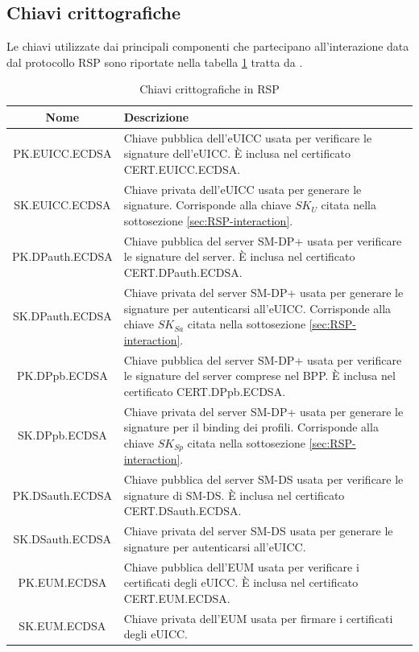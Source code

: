 \documentclass[10pt, twoside, openany]{book}
\begin{document}
\subsection{Chiavi crittografiche}
Le chiavi utilizzate dai principali componenti che partecipano all'interazione data dal protocollo RSP sono riportate nella tabella \ref{tab:keys} tratta da \cite{GSMA-docs}.
\begin{table}[h!]
\begin{center}
\captionsetup{skip=4pt}
\caption{Chiavi crittografiche in RSP}
\label{tab:keys}
\begin{tabularx}{\textwidth}{|c|X|}
\hline
\textbf{Nome} & \textbf{Descrizione}\\
\hline
PK.EUICC.ECDSA & Chiave pubblica dell'eUICC usata per verificare le signature dell'eUICC. È inclusa nel certificato CERT.EUICC.ECDSA.\\
\hline
SK.EUICC.ECDSA & Chiave privata dell'eUICC usata per generare le signature. Corrisponde alla chiave $SK_{U}$ citata nella sottosezione \ref{sec:RSP-interaction}.\\
\hline
PK.DPauth.ECDSA & Chiave pubblica del server SM-DP+ usata per verificare le signature del server. È inclusa nel certificato CERT.DPauth.ECDSA.\\
\hline
SK.DPauth.ECDSA & Chiave privata del server SM-DP+ usata per generare le signature per autenticarsi all'eUICC. Corrisponde alla chiave $SK_{Sa}$ citata nella sottosezione \ref{sec:RSP-interaction}.\\
\hline
PK.DPpb.ECDSA & Chiave pubblica del server SM-DP+ usata per verificare le signature del server comprese nel BPP.  È inclusa nel certificato CERT.DPpb.ECDSA.\\
\hline
SK.DPpb.ECDSA & Chiave privata del server SM-DP+ usata per generare le signature per il binding dei profili. Corrisponde alla chiave $SK_{Sp}$ citata nella sottosezione \ref{sec:RSP-interaction}.\\
\hline
PK.DSauth.ECDSA & Chiave pubblica del server SM-DS usata per verificare le signature di SM-DS. È inclusa nel certificato CERT.DSauth.ECDSA.\\
\hline
SK.DSauth.ECDSA & Chiave privata del server SM-DS usata per generare le signature per autenticarsi all'eUICC.\\
\hline
PK.EUM.ECDSA & Chiave pubblica dell'EUM usata per verificare i certificati degli eUICC. È inclusa nel certificato CERT.EUM.ECDSA.\\
\hline
SK.EUM.ECDSA & Chiave privata dell'EUM usata per firmare i certificati degli eUICC.\\

\end{tabularx}
\end{center}
\end{table}
\end{document}
